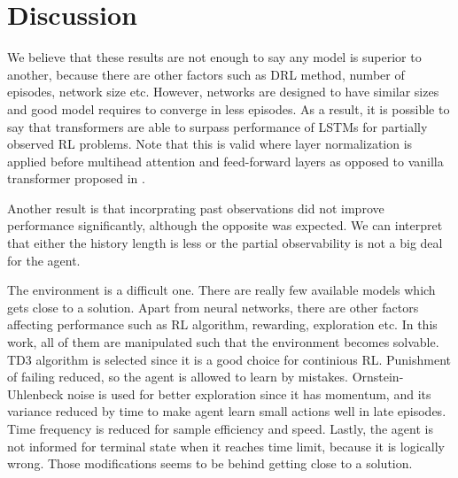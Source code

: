 \section{Discussion}
We believe that these results are not enough to say any model is superior to another, because there are other factors such as DRL method, number of episodes, network size etc. 
However, networks are designed to have similar sizes and good model requires to converge in less episodes. 
As a result, it is possible to say that transformers are able to surpass performance of LSTMs for partially observed RL problems. 
Note that this is valid where layer normalization is applied before multihead attention and feed-forward layers \cite{xiong_layer_2020} as opposed to vanilla transformer proposed in \cite{vaswani_attention_2017}. 

Another result is that incorprating past observations did not improve performance significantly, although the opposite was expected. 
We can interpret that either the history length is less or the partial observability is not a big deal for the agent. 

The environment is a difficult one. 
There are really few available models which gets close to a solution. 
Apart from neural networks, there are other factors affecting performance such as RL algorithm, rewarding, exploration etc. 
In this work, all of them are manipulated such that the environment becomes solvable. 
TD3 algorithm is selected since it is a good choice for continious RL. 
Punishment of failing reduced, so the agent is allowed to learn by mistakes. 
Ornstein-Uhlenbeck noise is used for better exploration since it has momentum, and its variance reduced by time to make agent learn small actions well in late episodes. 
Time frequency is reduced for sample efficiency and speed. 
Lastly, the agent is not informed for terminal state when it reaches time limit, because it is logically wrong. Those modifications seems to be behind getting close to a solution. 
